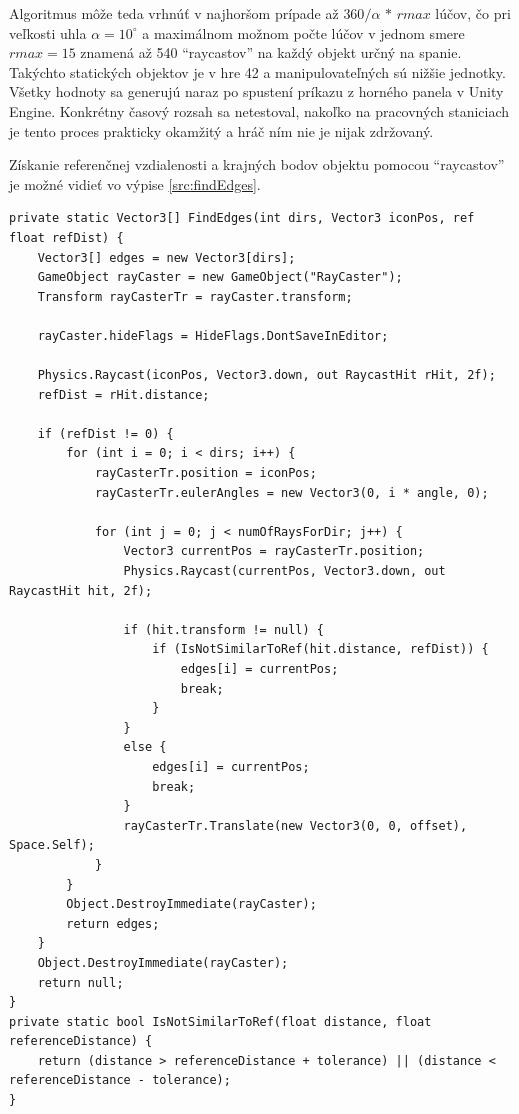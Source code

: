 \documentclass[slovak, bachelorpractice]{diploma}
\begin{document}
Algoritmus môže teda vrhnúť v najhoršom prípade až $360/\alpha\, *\, rmax$ lúčov, čo pri veľkosti uhla $\alpha = 10^{\circ}$ a maximálnom možnom počte lúčov v jednom smere $rmax = 15$ znamená až 540 \enquote{raycastov} na každý objekt určný na spanie. Takýchto statických objektov je v hre 42 a manipulovateľných sú nižšie jednotky. Všetky hodnoty sa generujú naraz po spustení príkazu z horného panela v Unity Engine. Konkrétny časový rozsah sa netestoval, nakoľko na pracovných staniciach je tento proces prakticky okamžitý a hráč ním nie je nijak zdržovaný.

Získanie referenčnej vzdialenosti a krajných bodov objektu pomocou \enquote{raycastov} je možné vidieť vo výpise \ref{src:findEdges}.

\vspace{10pt}
\begin{lstlisting}[label=src:findEdges,caption={Získanie referenčnej vzdialenosti a krajných bodov objektu}]
private static Vector3[] FindEdges(int dirs, Vector3 iconPos, ref float refDist) {
    Vector3[] edges = new Vector3[dirs];
    GameObject rayCaster = new GameObject("RayCaster");
    Transform rayCasterTr = rayCaster.transform;
    
    rayCaster.hideFlags = HideFlags.DontSaveInEditor;
    
    Physics.Raycast(iconPos, Vector3.down, out RaycastHit rHit, 2f);
    refDist = rHit.distance;

    if (refDist != 0) {
        for (int i = 0; i < dirs; i++) {
            rayCasterTr.position = iconPos;
            rayCasterTr.eulerAngles = new Vector3(0, i * angle, 0);

            for (int j = 0; j < numOfRaysForDir; j++) {
                Vector3 currentPos = rayCasterTr.position;
                Physics.Raycast(currentPos, Vector3.down, out RaycastHit hit, 2f);

                if (hit.transform != null) {
                    if (IsNotSimilarToRef(hit.distance, refDist)) {
                        edges[i] = currentPos;
                        break;
                    }
                }
                else {
                    edges[i] = currentPos;
                    break;
                }
                rayCasterTr.Translate(new Vector3(0, 0, offset), Space.Self);
            }
        }
        Object.DestroyImmediate(rayCaster);
        return edges;
    }
    Object.DestroyImmediate(rayCaster);
    return null;
}
private static bool IsNotSimilarToRef(float distance, float referenceDistance) {
    return (distance > referenceDistance + tolerance) || (distance < referenceDistance - tolerance);
}
\end{lstlisting}
\end{document}
